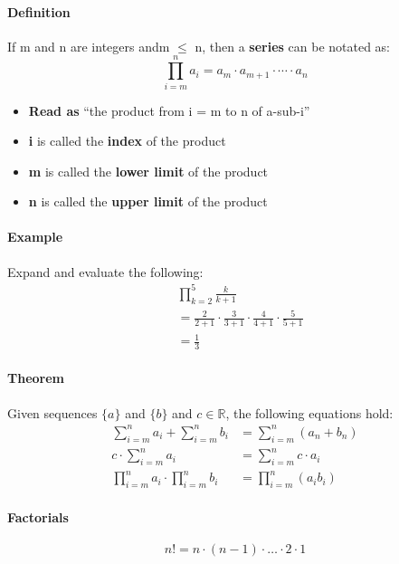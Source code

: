 \paragraph*{Definition}
If m and n are integers andm $\leq$ n, then a \textbf{series} can be notated as:
\begin{equation*}
    \prod_{i=m}^n a_i = a_m \cdot a_{m+1} \cdot \cdots \cdot a_n
\end{equation*} 

\begin{itemize}
    \item \textbf{Read as} ``the product from i = m to n of a-sub-i''
    \item \textbf{i} is called the \textbf{index} of the product
    \item \textbf{m} is called the \textbf{lower limit} of the product
    \item \textbf{n} is called the \textbf{upper limit} of the product
\end{itemize}

\paragraph*{Example}
Expand and evaluate the following:
\begin{align*}
    & \prod_{k=2}^{5} \frac{k}{k+1}\\
    &= \frac{2}{2+1} \cdot \frac{3}{3+1} \cdot \frac{4}{4+1} \cdot \frac{5}{5+1}\\
    &= \frac{1}{3}
\end{align*}

\paragraph*{Theorem}
Given sequences $\{a\}$ and $\{b\}$ and $c \in \mathbb{R}$, the following equations hold:
\begin{align*}
    \sum_{i=m}^{n} a_i + \sum_{i=m}^{n} b_i &= \sum_{i=m}^{n} (a_n + b_n)\\
    c \cdot \sum_{i=m}^{n} a_i &= \sum_{i=m}^{n} c \cdot a_i\\
    \prod_{i=m}^{n} a_i \cdot \prod_{i=m}^{n} b_i &= \prod_{i=m}^{n} (a_i b_i)
\end{align*}

\paragraph*{Factorials}
\begin{equation*}
    n! = n \cdot (n-1) \cdot \dots \cdot 2 \cdot 1
\end{equation*}

